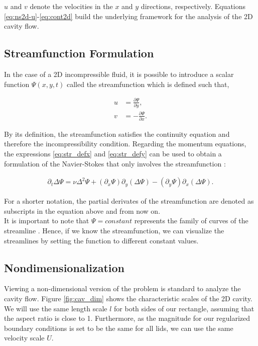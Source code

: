 $u$ and $v$ denote the velocities in the $x$ and $y$ directions, respectively.
Equations \eqref{eq:ns2d-u}-\eqref{eq:cont2d} build the underlying framework
for the analysis of the 2D cavity flow.

\subsection{Streamfunction Formulation}

In the case of a 2D incompressible fluid, it is possible to introduce a scalar
function $\Psi(x,y,t)$ called the streamfunction which is defined such that,

\begin{align}
u & = \frac{\partial \Psi}{\partial y}, \label{eq:str_defx} \\
v & = -\frac{\partial \Psi}{\partial x}. \label{eq:str_defy} 
\end{align}

By its definition, the streamfunction satisfies the continuity equation and
therefore the incompressibility condition. Regarding the momentum equations,
the expressions \eqref{eq:str_defx} and \eqref{eq:str_defy} can be used to
obtain a formulation of the Navier-Stokes that only involves the streamfunction
\citep{landau1987}: 

\begin{align}
\partial_t \Delta \Psi = \nu \Delta^2 \Psi
  + (\partial_x \Psi) \partial_y(\Delta \Psi)
  - (\partial_y \Psi) \partial_x(\Delta \Psi). \label{eq:str_dim}
\end{align}

For a shorter notation, the partial derivates of the streamfunction are denoted
as subscripts in the equation above and from now on. \\

It is important to note that $\Psi = constant$ represents the family of curves
of the streamline \citep{landau1987}. Hence, if we know the streamfunction, we
can visualize the streamlines by setting the function to different constant
values.

\subsection{Nondimensionalization}

Viewing a non-dimensional version of the problem is standard to analyze the
cavity flow. Figure \ref{fig:cav_dim} shows the characteristic scales of the 2D
cavity. We will use the same length scale $l$ for both sides of our rectangle,
assuming that the aspect ratio is close to 1. Furthermore, as the magnitude for
our regularized boundary conditions is set to be the same for all lids, we can
use the same velocity scale $U$.

